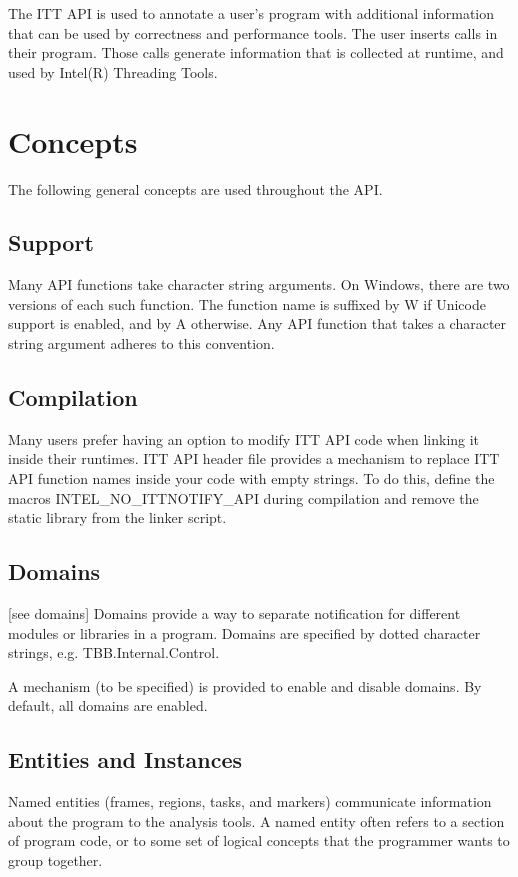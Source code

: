 The I\-T\-T A\-P\-I is used to annotate a user's program with additional information that can be used by correctness and performance tools. The user inserts calls in their program. Those calls generate information that is collected at runtime, and used by Intel(\-R) Threading Tools.\hypertarget{index_API}{}\section{Concepts}\label{index_API}
The following general concepts are used throughout the A\-P\-I.\hypertarget{index_Unicode}{}\subsection{Support}\label{index_Unicode}
Many A\-P\-I functions take character string arguments. On Windows, there are two versions of each such function. The function name is suffixed by W if Unicode support is enabled, and by A otherwise. Any A\-P\-I function that takes a character string argument adheres to this convention.\hypertarget{index_Conditional}{}\subsection{Compilation}\label{index_Conditional}
Many users prefer having an option to modify I\-T\-T A\-P\-I code when linking it inside their runtimes. I\-T\-T A\-P\-I header file provides a mechanism to replace I\-T\-T A\-P\-I function names inside your code with empty strings. To do this, define the macros I\-N\-T\-E\-L\-\_\-\-N\-O\-\_\-\-I\-T\-T\-N\-O\-T\-I\-F\-Y\-\_\-\-A\-P\-I during compilation and remove the static library from the linker script.\hypertarget{index_Domains}{}\subsection{Domains}\label{index_Domains}
\mbox{[}see domains\mbox{]} Domains provide a way to separate notification for different modules or libraries in a program. Domains are specified by dotted character strings, e.\-g. T\-B\-B.\-Internal.\-Control.

A mechanism (to be specified) is provided to enable and disable domains. By default, all domains are enabled. \hypertarget{index_Named}{}\subsection{Entities and Instances}\label{index_Named}
Named entities (frames, regions, tasks, and markers) communicate information about the program to the analysis tools. A named entity often refers to a section of program code, or to some set of logical concepts that the programmer wants to group together.

